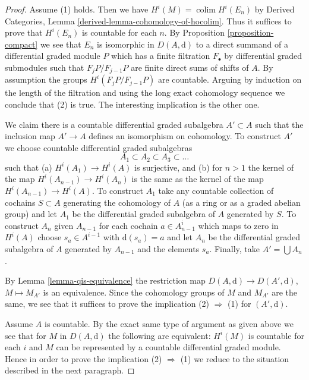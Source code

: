 \documentclass{stacks-project}
\theoremstyle{plain}
\theoremstyle{definition}
\theoremstyle{remark}
\numberwithin{equation}{subsection}
\def\colim{\mathop{\mathrm{colim}}\nolimits}
\begin{document}
\begin{proof}
Assume (1) holds. Then we have $H^i(M) = \colim H^i(E_n)$ by
Derived Categories, Lemma \ref{derived-lemma-cohomology-of-hocolim}.
Thus it suffices to prove that $H^i(E_n)$ is countable for each $n$.
By Proposition \ref{proposition-compact} we see that $E_n$
is isomorphic in $D(A, \text{d})$ to a direct summand of a
differential graded module $P$ which has a finite filtration
$F_\bullet$ by differential graded submodules
such that $F_jP/F_{j - 1}P$ are finite direct sums of shifts of $A$.
By assumption the groups $H^i(F_jP/F_{j - 1}P)$ are countable.
Arguing by induction on the length of the filtration and using
the long exact cohomology sequence we conclude that (2) is true.
The interesting implication is the other one.

\medskip\noindent
We claim there is a countable differential graded
subalgebra $A' \subset A$ such that the inclusion map
$A' \to A$ defines an isomorphism on cohomology.
To construct $A'$ we choose countable differential graded
subalgebras
$$
A_1 \subset A_2 \subset A_3 \subset \ldots
$$
such that (a) $H^i(A_1) \to H^i(A)$ is surjective, and (b)
for $n > 1$ the kernel of the map $H^i(A_{n - 1}) \to H^i(A_n)$
is the same as the kernel of the map $H^i(A_{n - 1}) \to H^i(A)$.
To construct $A_1$ take any countable collection of cochains
$S \subset A$ generating the cohomology of $A$ (as a ring or as
a graded abelian group) and let
$A_1$ be the differential graded subalgebra of $A$ generated by $S$.
To construct $A_n$ given $A_{n - 1}$ for each cochain $a \in A_{n - 1}^i$
which maps to zero in $H^i(A)$ choose $s_a \in A^{i - 1}$
with $\text{d}(s_a) = a$ and let $A_n$ be the differential graded
subalgebra of $A$ generated by $A_{n - 1}$ and the elements $s_a$.
Finally, take $A' = \bigcup A_n$.

\medskip\noindent
By Lemma \ref{lemma-qis-equivalence}
the restriction map $D(A, \text{d}) \to D(A', \text{d})$,
$M \mapsto M_{A'}$ is an equivalence. Since the cohomology
groups of $M$ and $M_{A'}$ are the same, we see that it
suffices to prove the implication (2) $\Rightarrow$ (1)
for $(A', \text{d})$.

\medskip\noindent
Assume $A$ is countable. By the exact same type of argument as
given above we see that for $M$ in $D(A, \text{d})$
the following are equivalent: $H^i(M)$ is countable for each $i$
and $M$ can be represented by a countable differential graded module.
Hence in order to prove the implication (2) $\Rightarrow$ (1)
we reduce to the situation described in the next paragraph.


\end{proof}
\end{document}
